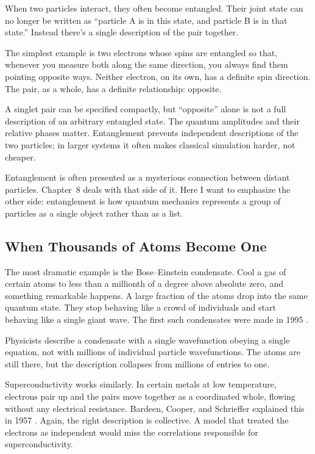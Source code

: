 When two particles interact, they often become entangled. Their joint state can no longer be written as ``particle A is in this state, and particle B is in that state.'' Instead there's a single description of the pair together.

The simplest example is two electrons whose spins are entangled so that, whenever you measure both along the same direction, you always find them pointing opposite ways. Neither electron, on its own, has a definite spin direction. The pair, as a whole, has a definite relationship: opposite.

A singlet pair can be specified compactly, but ``opposite'' alone is not a full description of an arbitrary entangled state. The quantum amplitudes and their relative phases matter. Entanglement prevents independent descriptions of the two particles; in larger systems it often makes classical simulation harder, not cheaper.

Entanglement is often presented as a mysterious connection between distant particles. Chapter~8 deals with that side of it. Here I want to emphasize the other side: entanglement is how quantum mechanics represents a group of particles as a single object rather than as a list.

\subsection{When Thousands of Atoms Become One}

The most dramatic example is the Bose--Einstein condensate. Cool a gas of certain atoms to less than a millionth of a degree above absolute zero, and something remarkable happens. A large fraction of the atoms drop into the same quantum state. They stop behaving like a crowd of individuals and start behaving like a single giant wave. The first such condensates were made in 1995 \cite{anderson1995}.

Physicists describe a condensate with a single wavefunction obeying a single equation, not with millions of individual particle wavefunctions. The atoms are still there, but the description collapses from millions of entries to one.

Superconductivity works similarly. In certain metals at low temperature, electrons pair up and the pairs move together as a coordinated whole, flowing without any electrical resistance. Bardeen, Cooper, and Schrieffer explained this in 1957 \cite{bcs1957}. Again, the right description is collective. A model that treated the electrons as independent would miss the correlations responsible for superconductivity.

